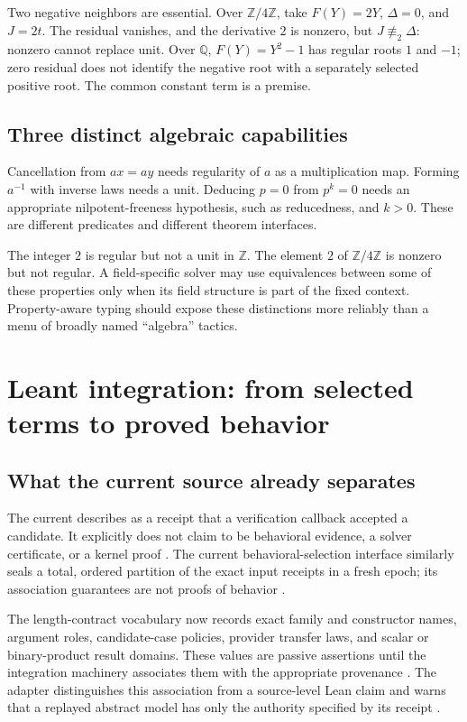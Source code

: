 \documentclass[11pt,a4paper]{article}
\newcommand{\code}[1]{\texttt{\detokenize{#1}}}
\newcommand{\Z}{\mathbb Z}
\newcommand{\Q}{\mathbb Q}
\theoremstyle{plain}
\theoremstyle{definition}
\begin{document}
Two negative neighbors are essential. Over $\Z/4\Z$, take $F(Y)=2Y$, $\Delta=0$, and $J=2t$. The residual vanishes, and the derivative $2$ is nonzero, but $J\not\equiv_2\Delta$: nonzero cannot replace unit. Over $\Q$, $F(Y)=Y^2-1$ has regular roots $1$ and $-1$; zero residual does not identify the negative root with a separately selected positive root. The common constant term is a premise.

\subsection{Three distinct algebraic capabilities}
Cancellation from $ax=ay$ needs regularity of $a$ as a multiplication map. Forming $a^{-1}$ with inverse laws needs a unit. Deducing $p=0$ from $p^k=0$ needs an appropriate nilpotent-freeness hypothesis, such as reducedness, and $k>0$. These are different predicates and different theorem interfaces.

The integer $2$ is regular but not a unit in $\Z$. The element $2$ of $\Z/4\Z$ is nonzero but not regular. A field-specific solver may use equivalences between some of these properties only when its field structure is part of the fixed context. Property-aware typing should expose these distinctions more reliably than a menu of broadly named ``algebra'' tactics.

\section{Leant integration: from selected terms to proved behavior}\label{sec:leant}

\subsection{What the current source already separates}
The current  describes \code{Verified candidate} as a receipt that a verification callback accepted a candidate. It explicitly does not claim to be behavioral evidence, a solver certificate, or a kernel proof \cite{leant-verification}. The current behavioral-selection interface similarly seals a total, ordered partition of the exact input receipts in a fresh epoch; its association guarantees are not proofs of behavior \cite{leant-selection}.

The length-contract vocabulary now records exact family and constructor names, argument roles, candidate-case policies, provider transfer laws, and scalar or binary-product result domains. These values are passive assertions until the integration machinery associates them with the appropriate provenance \cite{leant-contract}. The adapter distinguishes this association from a source-level Lean claim and warns that a replayed abstract model has only the authority specified by its receipt \cite{leant-adapter}.
\end{document}
